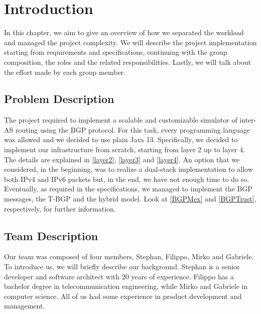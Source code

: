 \chapter{Introduction}
In this chapter, we aim to give an overview of how we separated the workload and managed the project complexity.
We will describe the project implementation starting from requirements and specifications, continuing with the group composition, the roles and the related responsibilities.
Lastly, we will talk about the effort made by each group member.

\section{Problem Description}
The project required to implement a scalable and customizable simulator of inter-AS routing using the BGP protocol.
For this task, every programming language was allowed and we decided to use plain Java 13.
Specifically, we decided to implement our infrastructure from scratch, starting from layer 2 up to layer 4. The details are explained in \ref{layer2}, \ref{layer3} and \ref{layer4}.
An option that we considered, in the beginning, was to realize a dual-stack implementation to allow both IPv4 and IPv6 packets but, in the end, we have not enough time to do so.
Eventually, as required in the specifications, we managed to implement the BGP messages, the T-BGP and the hybrid model. Look at \ref{BGPMex} and \ref{BGPTrust}, respectively, for further information.

\section{Team Description}
Our team was composed of four members, Stephan, Filippo, Mirko and Gabriele. To introduce us, we will briefly describe our background.\newline
Stephan is a senior developer and software architect with 20 years of experience.\newline
Filippo has a bachelor degree in telecommunication engineering, while Mirko and Gabriele in computer science.\newline
All of us had some experience in product development and management.

